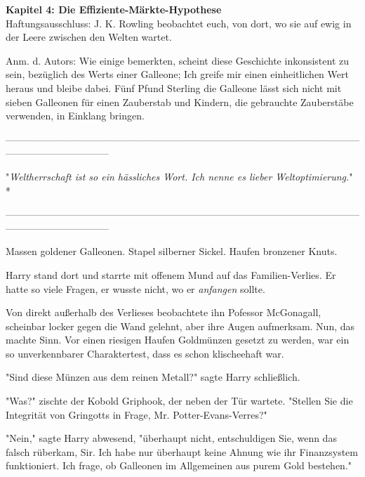 

\hypertarget{die-effiziente-muxe4rkte-hypothese}{%

\textbf{Kapitel 4: Die Effiziente-Märkte-Hypothese}\\

Haftungsausschluss: J. K. Rowling beobachtet euch, von dort, wo sie auf ewig in der Leere zwischen den Welten wartet.

Anm. d. Autors: Wie einige bemerkten, scheint diese Geschichte inkonsistent zu sein, bezüglich des Werts einer Galleone; Ich greife mir einen einheitlichen Wert heraus und bleibe dabei. Fünf Pfund Sterling die Galleone lässt sich nicht mit sieben Galleonen für einen Zauberstab und Kindern, die gebrauchte Zauberstäbe verwenden, in Einklang bringen.

--------------------------------------------------------------------------------------------------------------------------------------------

"\emph{Weltherrschaft ist so ein hässliches Wort. Ich nenne es lieber Weltoptimierung.}" *

--------------------------------------------------------------------------------------------------------------------------------------------

Massen goldener Galleonen. Stapel silberner Sickel. Haufen bronzener Knuts.

Harry stand dort und starrte mit offenem Mund auf das Familien-Verlies. Er hatte so viele Fragen, er wusste nicht, wo er \emph{anfangen} sollte.

Von direkt außerhalb des Verlieses beobachtete ihn Pofessor McGonagall, scheinbar locker gegen die Wand gelehnt, aber ihre Augen aufmerksam. Nun, das machte Sinn. Vor einen riesigen Haufen Goldmünzen gesetzt zu werden, war ein so unverkennbarer Charaktertest, dass es schon klischeehaft war.

"Sind diese Münzen aus dem reinen Metall?" sagte Harry schließlich.

"Was?" zischte der Kobold Griphook, der neben der Tür wartete. "Stellen Sie die Integrität von Gringotts in Frage, Mr. Potter-Evans-Verres?"

"Nein," sagte Harry abwesend, "überhaupt nicht, entschuldigen Sie, wenn das falsch rüberkam, Sir. Ich habe nur überhaupt keine Ahnung wie ihr Finanzsystem funktioniert. Ich frage, ob Galleonen im Allgemeinen aus purem Gold bestehen."

}

